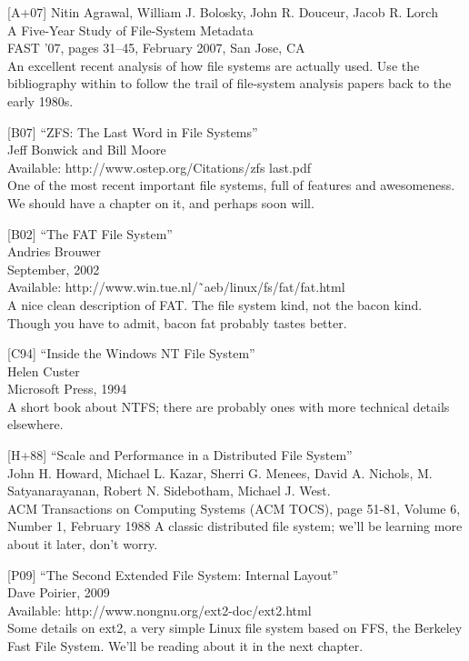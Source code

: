 {[}A+07{]} Nitin Agrawal, William J. Bolosky, John R. Douceur, Jacob R.
Lorch\\
A Five-Year Study of File-System Metadata\\
FAST '07, pages 31--45, February 2007, San Jose, CA\\
An excellent recent analysis of how file systems are actually used. Use
the bibliography within to follow the trail of file-system analysis
papers back to the early 1980s.

{[}B07{]} ``ZFS: The Last Word in File Systems''\\
Jeff Bonwick and Bill Moore\\
Available: http://www.ostep.org/Citations/zfs last.pdf\\
One of the most recent important file systems, full of features and
awesomeness. We should have a chapter on it, and perhaps soon will.

{[}B02{]} ``The FAT File System''\\
Andries Brouwer\\
September, 2002\\
Available: http://www.win.tue.nl/˜aeb/linux/fs/fat/fat.html\\
A nice clean description of FAT. The file system kind, not the bacon
kind. Though you have to admit, bacon fat probably tastes better.

{[}C94{]} ``Inside the Windows NT File System''\\
Helen Custer\\
Microsoft Press, 1994\\
A short book about NTFS; there are probably ones with more technical
details elsewhere.

{[}H+88{]} ``Scale and Performance in a Distributed File System''\\
John H. Howard, Michael L. Kazar, Sherri G. Menees, David A. Nichols, M.
Satyanarayanan, Robert N. Sidebotham, Michael J. West.\\
ACM Transactions on Computing Systems (ACM TOCS), page 51-81, Volume 6,
Number 1, February 1988 A classic distributed file system; we'll be
learning more about it later, don't worry.

{[}P09{]} ``The Second Extended File System: Internal Layout''\\
Dave Poirier, 2009\\
Available: http://www.nongnu.org/ext2-doc/ext2.html\\
Some details on ext2, a very simple Linux file system based on FFS, the
Berkeley Fast File System. We'll be reading about it in the next
chapter.

